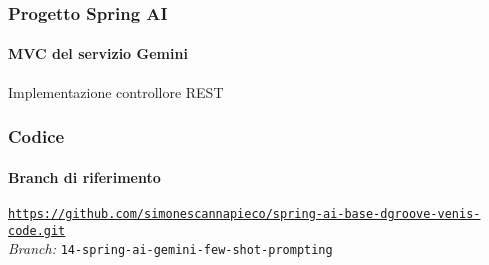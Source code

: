 %
\begin{frame}[t,fragile] \frametitle{Progetto Spring AI}
    \framesubtitle{MVC del servizio Gemini}
    	\vspace*{-.7cm}
        \begin{block}{Implementazione controllore REST}
			{\tiny}
    	\end{block}
\end{frame}
%
\begin{frame}[fragile] \frametitle{Codice}
    \framesubtitle{Branch di riferimento}
	\begin{center}
		{\scriptsize \href{https://github.com/simonescannapieco/spring-ai-base-dgroove-venis-code.git}{\texttt{https://github.com/simonescannapieco/spring-ai-base-dgroove-venis-code.git}}}\\
		\textit{Branch:} \alert{\texttt{14-spring-ai-gemini-few-shot-prompting}}
	\end{center}
\end{frame}